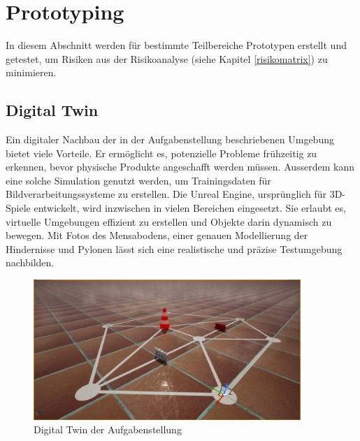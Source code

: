 \documentclass[../main.tex]{subfiles}
\begin{document}
\newpage
\section{Prototyping} \label{a4:prototyping}

In diesem Abschnitt werden für bestimmte Teilbereiche Prototypen erstellt und getestet,  
um Risiken aus der Risikoanalyse (siehe Kapitel \ref{risikomatrix}) zu minimieren.

\subsection{Digital Twin}
Ein digitaler Nachbau der in der Aufgabenstellung beschriebenen Umgebung bietet viele Vorteile. Er ermöglicht es, potenzielle Probleme frühzeitig zu erkennen, bevor physische Produkte angeschafft werden müssen. Ausserdem kann eine solche Simulation genutzt werden, um Trainingsdaten für Bildverarbeitungssysteme zu erstellen. Die Unreal Engine, ursprünglich für 3D-Spiele entwickelt, wird inzwischen in vielen Bereichen eingesetzt. Sie erlaubt es, virtuelle Umgebungen effizient zu erstellen und Objekte darin dynamisch zu bewegen. Mit Fotos des Mensabodens, einer genauen Modellierung der Hindernisse und Pylonen lässt sich eine realistische und präzise Testumgebung nachbilden.

\begin{figure}[H]
    \centering
    \includegraphics[width=0.9\textwidth]{img/unrealengine/overview.png}
    \caption{Digital Twin der Aufgabenstellung}
\label{img:Übersicht Unreal Engine}
\end{figure}
\end{document}
